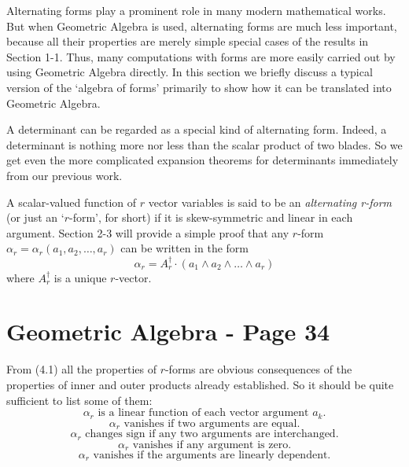 \documentclass[fleqn]{scrartcl}
\numberwithin{equation}{section}
\begin{document}
\vspace{1em}
\noindent Alternating forms play a prominent role in many modern mathematical works. But when Geometric Algebra is used, alternating forms are much less important, because all their properties are merely simple special cases of the results in Section 1-1. Thus, many computations with forms are more easily carried out by using Geometric Algebra directly. In this section we briefly discuss a typical version of the `algebra of forms' primarily to show how it can be translated into Geometric Algebra.

\vspace{1em}
\noindent A determinant can be regarded as a special kind of alternating form. Indeed, a determinant is nothing more nor less than the scalar product of two blades. So we get even the more complicated expansion theorems for determinants immediately from our previous work.

\vspace{1em}
\noindent A scalar-valued function of \(r\) vector variables is said to be an \textit{alternating r-form} (or just an `\(r\)-form', for short) if it is skew-symmetric and linear in each argument. Section 2-3 will provide a simple proof that any \(r\)-form \(\alpha_r = \alpha_r(a_1, a_2, \dots, a_r)\) can be written in the form
\begin{equation}
\alpha_r = A_r^{\dagger} \cdot (a_1 \wedge a_2 \wedge \dots \wedge a_r) \tag{4.1}
\end{equation}
where \(A_r^{\dagger}\) is a unique \(r\)-vector.

\section*{Geometric Algebra - Page 34}

\noindent From (4.1) all the properties of \(r\)-forms are obvious consequences of the properties of inner and outer products already established. So it should be quite sufficient to list some of them:
\begin{equation}
\alpha_r \text{ is a linear function of each vector argument } a_k. \tag{4.2a}
\end{equation}
\begin{equation}
\alpha_r \text{ vanishes if two arguments are equal.} \tag{4.2b}
\end{equation}
\begin{equation}
\alpha_r \text{ changes sign if any two arguments are interchanged.} \tag{4.2c}
\end{equation}
\begin{equation}
\alpha_r \text{ vanishes if any argument is zero.} \tag{4.2d}
\end{equation}
\begin{equation}
\alpha_r \text{ vanishes if the arguments are linearly dependent.} \tag{4.2e}
\end{equation}
\end{document}
